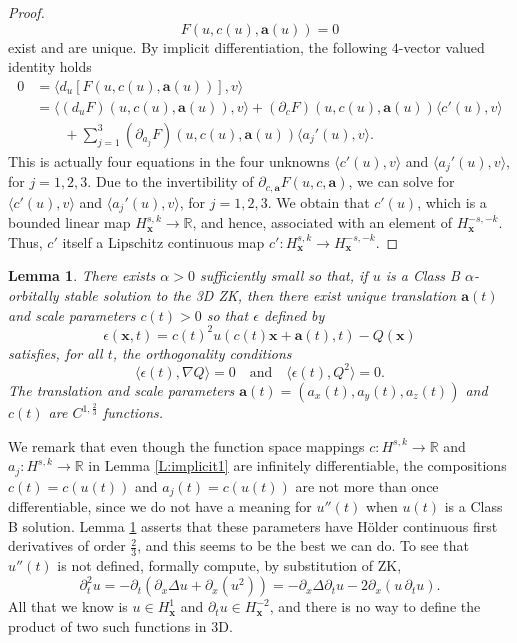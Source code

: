 \documentclass[12pt,letterpaper]{amsart}
\newcommand{\la}{\langle}
\newcommand{\ra}{\rangle}
\newtheorem{lemma}[theorem]{Lemma}
\theoremstyle{remark}
\numberwithin{equation}{section}
\numberwithin{theorem}{section}
\numberwithin{table}{section}
\begin{document}
\begin{proof}
$$
F(u, c(u), \mathbf{a}(u))=0
$$
exist and are unique.  By implicit differentiation, the following $4$-vector valued identity holds
\begin{align*}
0 &= \la d_u  [F(u,c(u),\mathbf{a}(u))], v\ra \\
&= \la (d_uF)(u,c(u),\mathbf{a}(u)), v\ra  
+ (\partial_c F)(u,c(u),\mathbf{a}(u)) \la c'(u), v\ra  \\
 &  \qquad + \sum_{j=1}^3 (\partial_{a_j} F)(u,c(u),\mathbf{a}(u)) \la a_j'(u), v\ra.
\end{align*}
This is actually four equations in the four unknowns $\la c'(u), v\ra$ and $\la a_j'(u), v\ra$, for $j=1, 2, 3$.
Due to the invertibility of $\partial_{c,\mathbf{a}}F(u,c,\mathbf{a})$, we can solve for $\la c'(u), v\ra$ and $\la a_j'(u), v\ra$, for $j=1, 2, 3$.  We obtain that $c'(u)$, which is a bounded linear map $H_{\mathbf{x}}^{s,k} \to \mathbb{R}$, and hence, associated with an element of $H_{\mathbf{x}}^{-s,-k}$.  Thus, $c'$ itself a Lipschitz continuous map $c':H_{\mathbf{x}}^{s,k} \to H_{\mathbf{x}}^{-s,-k}$.  
\end{proof}

\begin{lemma}
\label{L:implicit1b}
There exists $\alpha>0$ sufficiently small so that, if $u$ is a Class B $\alpha$-orbitally stable solution to the 3D ZK, then there exist \emph{unique} translation $\mathbf{a}(t)$ and scale parameters $c(t)>0$ so that $\epsilon$ defined by
$$\epsilon(\mathbf{x},t) = c(t)^2u(c(t)\mathbf{x}+\mathbf{a}(t),t) - Q(\mathbf{x})$$
satisfies, for all $t$, the orthogonality conditions
$$\la \epsilon(t), \nabla Q \ra =0 \quad \mbox{and} \quad \la \epsilon(t), Q^2 \ra =0.$$
The translation and scale parameters $\mathbf{a}(t)=(a_x(t),a_y(t),a_z(t))$ and $c(t)$ are $C^{1,\frac23}$ functions.
\end{lemma}

We remark that even though the function space mappings $c: H^{s,k} \to \mathbb{R}$ and $a_j:H^{s,k} \to \mathbb{R}$ in Lemma \ref{L:implicit1} are infinitely differentiable, the compositions $c(t) = c(u(t))$ and $a_j(t) =c(u(t))$ are not more than once differentiable, since we do not have a meaning for $u''(t)$ when $u(t)$ is a Class B solution.  Lemma \ref{L:implicit1b} asserts that these parameters have H\"older continuous first derivatives of order $\frac23$, and this seems to be the best we can do.  To see that $u''(t)$ is not defined, formally compute, by substitution of ZK,
$$
\partial_t^2 u = -\partial_t (\partial_x \Delta u + \partial_x (u^2))= - \partial_x \Delta \partial_t u - 2\partial_x( u \, \partial_t u).
$$
All that we know is $u\in H_{\mathbf{x}}^1$ and $\partial_t u \in H_{\mathbf{x}}^{-2}$, and there is no way to define the product of two such functions in 3D.  
\end{document}
